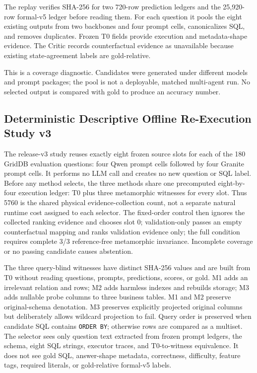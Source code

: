 \documentclass[applsci,article,submit,moreauthors]{Definitions/mdpi}
\begin{document}
The replay verifies SHA-256 for two 720-row prediction ledgers and the 25,920-row formal-v5 ledger before reading them. For each question it pools the eight existing outputs from two backbones and four prompt cells, canonicalizes SQL, and removes duplicates. Frozen T0 fields provide execution and metadata-shape evidence. The Critic records counterfactual evidence as unavailable because existing state-agreement labels are gold-relative.

This is a coverage diagnostic. Candidates were generated under different models and prompt packages; the pool is not a deployable, matched multi-agent run. No selected output is compared with gold to produce an accuracy number.

\subsection{Deterministic Descriptive Offline Re-Execution Study v3}

The release-v3 study reuses exactly eight frozen source slots for each of the 180 GridDB evaluation questions: four Qwen prompt cells followed by four Granite prompt cells. It performs no LLM call and creates no new question or SQL label. Before any method selects, the three methods share one precomputed eight-by-four execution ledger: T0 plus three metamorphic witnesses for every slot. Thus 5760 is the shared physical evidence-collection count, not a separate natural runtime cost assigned to each selector. The fixed-order control then ignores the collected ranking evidence and chooses slot 0; validation-only passes an empty counterfactual mapping and ranks validation evidence only; the full condition requires complete 3/3 reference-free metamorphic invariance. Incomplete coverage or no passing candidate causes abstention.

The three query-blind witnesses have distinct SHA-256 values and are built from T0 without reading questions, prompts, predictions, scores, or gold. M1 adds an irrelevant relation and rows; M2 adds harmless indexes and rebuilds storage; M3 adds nullable probe columns to three business tables. M1 and M2 preserve original-schema denotation. M3 preserves explicitly projected original columns but deliberately allows wildcard projection to fail. Query order is preserved when candidate SQL contains \texttt{ORDER BY}; otherwise rows are compared as a multiset. The selector sees only question text extracted from frozen prompt ledgers, the schema, eight SQL strings, executor traces, and T0-to-witness equivalence. It does not see gold SQL, answer-shape metadata, correctness, difficulty, feature tags, required literals, or gold-relative formal-v5 labels.
\end{document}
